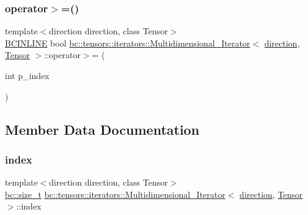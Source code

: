 \mbox{\label{structbc_1_1tensors_1_1iterators_1_1Multidimensional__Iterator_ab6e2e24fb380a3a48a92b489e28f22bb}} 
\subsubsection{\texorpdfstring{operator$>$=()}{operator>=()}\hspace{0.1cm}{\footnotesize\ttfamily [2/2]}}
{\footnotesize\ttfamily template$<$direction direction, class Tensor$>$ \\
\hyperlink{common_8h_a6699e8b0449da5c0fafb878e59c1d4b1}{B\+C\+I\+N\+L\+I\+NE} bool \hyperlink{structbc_1_1tensors_1_1iterators_1_1Multidimensional__Iterator}{bc\+::tensors\+::iterators\+::\+Multidimensional\+\_\+\+Iterator}$<$ \hyperlink{namespacebc_1_1tensors_1_1iterators_ae76efe63fb9cb4985d5e4e6af0ebf296}{direction}, \hyperlink{namespacebc_a659391e47ab612be3ba6c18cf9c89159}{Tensor} $>$\+::operator$>$= (\begin{DoxyParamCaption}\item[{int}]{p\+\_\+index }\end{DoxyParamCaption})\hspace{0.3cm}{\ttfamily [inline]}}



\subsection{Member Data Documentation}
\mbox{\label{structbc_1_1tensors_1_1iterators_1_1Multidimensional__Iterator_ac11ada5f5f79b107b2c21b5bb947918f}} 
\subsubsection{\texorpdfstring{index}{index}}
{\footnotesize\ttfamily template$<$direction direction, class Tensor$>$ \\
\hyperlink{namespacebc_aaf8e3fbf99b04b1b57c4f80c6f55d3c5}{bc\+::size\+\_\+t} \hyperlink{structbc_1_1tensors_1_1iterators_1_1Multidimensional__Iterator}{bc\+::tensors\+::iterators\+::\+Multidimensional\+\_\+\+Iterator}$<$ \hyperlink{namespacebc_1_1tensors_1_1iterators_ae76efe63fb9cb4985d5e4e6af0ebf296}{direction}, \hyperlink{namespacebc_a659391e47ab612be3ba6c18cf9c89159}{Tensor} $>$\+::index}

